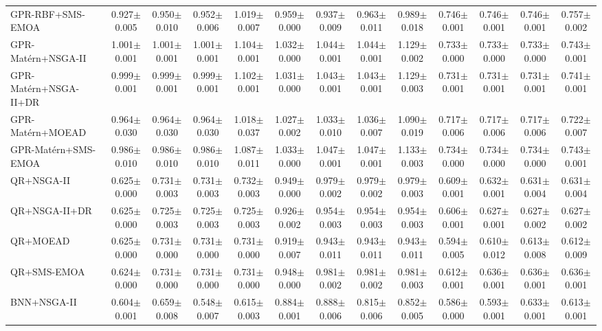 \begin{table}[htbp]
{\begin{tabular}{l c c c c c c c c c c c c}
GPR-RBF+SMS-EMOA & 0.927$\pm$0.005 & 0.950$\pm$0.010 & 0.952$\pm$0.006 & 1.019$\pm$0.007 & 0.959$\pm$0.000 & 0.937$\pm$0.009 & 0.963$\pm$0.011 & 0.989$\pm$0.018 & 0.746$\pm$0.001 & 0.746$\pm$0.001 & 0.746$\pm$0.001 & 0.757$\pm$0.002 \\
GPR-Mat\'ern+NSGA-II & 1.001$\pm$0.001 & 1.001$\pm$0.001 & 1.001$\pm$0.001 & 1.104$\pm$0.001 & 1.032$\pm$0.000 & 1.044$\pm$0.001 & 1.044$\pm$0.001 & 1.129$\pm$0.002 & 0.733$\pm$0.000 & 0.733$\pm$0.000 & 0.733$\pm$0.000 & 0.743$\pm$0.001 \\
GPR-Mat\'ern+NSGA-II+DR & 0.999$\pm$0.001 & 0.999$\pm$0.001 & 0.999$\pm$0.001 & 1.102$\pm$0.001 & 1.031$\pm$0.000 & 1.043$\pm$0.001 & 1.043$\pm$0.001 & 1.129$\pm$0.003 & 0.731$\pm$0.001 & 0.731$\pm$0.001 & 0.731$\pm$0.001 & 0.741$\pm$0.001 \\
GPR-Mat\'ern+MOEAD & 0.964$\pm$0.030 & 0.964$\pm$0.030 & 0.964$\pm$0.030 & 1.018$\pm$0.037 & 1.027$\pm$0.002 & 1.033$\pm$0.010 & 1.036$\pm$0.007 & 1.090$\pm$0.019 & 0.717$\pm$0.006 & 0.717$\pm$0.006 & 0.717$\pm$0.006 & 0.722$\pm$0.007 \\
GPR-Mat\'ern+SMS-EMOA & 0.986$\pm$0.010 & 0.986$\pm$0.010 & 0.986$\pm$0.010 & 1.087$\pm$0.011 & 1.033$\pm$0.000 & 1.047$\pm$0.001 & 1.047$\pm$0.001 & 1.133$\pm$0.003 & 0.734$\pm$0.000 & 0.734$\pm$0.000 & 0.734$\pm$0.000 & 0.743$\pm$0.001 \\
QR+NSGA-II & 0.625$\pm$0.000 & 0.731$\pm$0.003 & 0.731$\pm$0.003 & 0.732$\pm$0.003 & 0.949$\pm$0.000 & 0.979$\pm$0.002 & 0.979$\pm$0.002 & 0.979$\pm$0.003 & 0.609$\pm$0.001 & 0.632$\pm$0.001 & 0.631$\pm$0.004 & 0.631$\pm$0.004 \\
QR+NSGA-II+DR & 0.625$\pm$0.000 & 0.725$\pm$0.003 & 0.725$\pm$0.003 & 0.725$\pm$0.003 & 0.926$\pm$0.002 & 0.954$\pm$0.003 & 0.954$\pm$0.003 & 0.954$\pm$0.003 & 0.606$\pm$0.001 & 0.627$\pm$0.001 & 0.627$\pm$0.002 & 0.627$\pm$0.002 \\
QR+MOEAD & 0.625$\pm$0.000 & 0.731$\pm$0.000 & 0.731$\pm$0.000 & 0.731$\pm$0.000 & 0.919$\pm$0.007 & 0.943$\pm$0.011 & 0.943$\pm$0.011 & 0.943$\pm$0.011 & 0.594$\pm$0.005 & 0.610$\pm$0.012 & 0.613$\pm$0.008 & 0.612$\pm$0.009 \\
QR+SMS-EMOA & 0.624$\pm$0.000 & 0.731$\pm$0.000 & 0.731$\pm$0.000 & 0.731$\pm$0.000 & 0.948$\pm$0.000 & 0.981$\pm$0.002 & 0.981$\pm$0.002 & 0.981$\pm$0.003 & 0.612$\pm$0.001 & 0.636$\pm$0.001 & 0.636$\pm$0.001 & 0.636$\pm$0.001 \\
BNN+NSGA-II & 0.604$\pm$0.001 & 0.659$\pm$0.008 & 0.548$\pm$0.007 & 0.615$\pm$0.003 & 0.884$\pm$0.001 & 0.888$\pm$0.006 & 0.815$\pm$0.006 & 0.852$\pm$0.005 & 0.586$\pm$0.000 & 0.593$\pm$0.001 & 0.633$\pm$0.001 & 0.613$\pm$0.001 \\

\end{tabular}}
\end{table}
